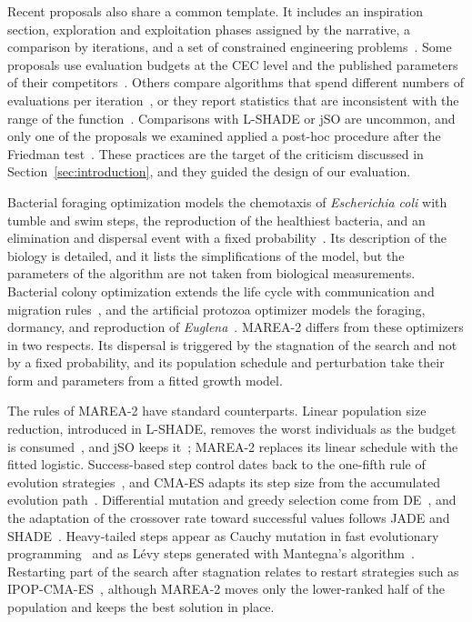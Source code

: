 \documentclass[preprint,12pt]{elsarticle}
\begin{document}
Recent proposals also share a common template. It includes an inspiration
section, exploration and exploitation phases assigned by the narrative, a
comparison by iterations, and a set of constrained engineering
problems~\cite{sadeeq2022gto,albetar2024eho,azizi2023evo}. Some proposals use
evaluation budgets at the CEC level and the published parameters of their
competitors~\cite{dehghani2023coa,abdelbasset2023koa,wang2024apo}. Others
compare algorithms that spend different numbers of evaluations per
iteration~\cite{ahmadianfar2021run,heidari2019hho,fu2024sboa}, or they report
statistics that are inconsistent with the range of the
function~\cite{khishe2020choa}.
Comparisons with L-SHADE or jSO are uncommon, and only one of the proposals we
examined applied a post-hoc procedure after the Friedman
test~\cite{albetar2024eho}. These practices are the target of the criticism
discussed in Section~\ref{sec:introduction}, and they guided the design of our
evaluation.

Bacterial foraging optimization models the chemotaxis of \emph{Escherichia
coli} with tumble and swim steps, the reproduction of the healthiest bacteria,
and an elimination and dispersal event with a fixed
probability~\cite{passino2002bfo}. Its description of the biology is detailed,
and it lists the simplifications of the model, but the parameters of the
algorithm are not taken from biological measurements. Bacterial colony
optimization extends the life cycle with communication and migration
rules~\cite{niu2012bco}, and the artificial protozoa optimizer models the
foraging, dormancy, and reproduction of \emph{Euglena}~\cite{wang2024apo}.
MAREA-2 differs from these optimizers in two respects. Its dispersal is
triggered by the stagnation of the search and not by a fixed probability, and
its population schedule and perturbation take their form and parameters from a
fitted growth model.

The rules of MAREA-2 have standard counterparts. Linear population size
reduction, introduced in L-SHADE, removes the worst individuals as the budget
is consumed~\cite{tanabe2014lshade}, and jSO keeps it~\cite{brest2017jso};
MAREA-2 replaces its linear schedule with the fitted logistic. Success-based
step control dates back to the one-fifth rule of evolution
strategies~\cite{rechenberg1973evolutionsstrategie}, and CMA-ES adapts its step
size from the accumulated evolution path~\cite{hansen2001cmaes}. Differential
mutation and greedy selection come from DE~\cite{storn1997de}, and the
adaptation of the crossover rate toward successful values follows JADE and
SHADE~\cite{zhang2009jade,tanabe2013shade}. Heavy-tailed steps appear as Cauchy
mutation in fast evolutionary programming~\cite{yao1999fep} and as Lévy steps
generated with Mantegna's algorithm~\cite{mantegna1994levy}. Restarting part of
the search after stagnation relates to restart strategies such as
IPOP-CMA-ES~\cite{auger2005ipop}, although MAREA-2 moves only the lower-ranked
half of the population and keeps the best solution in place.
\end{document}
